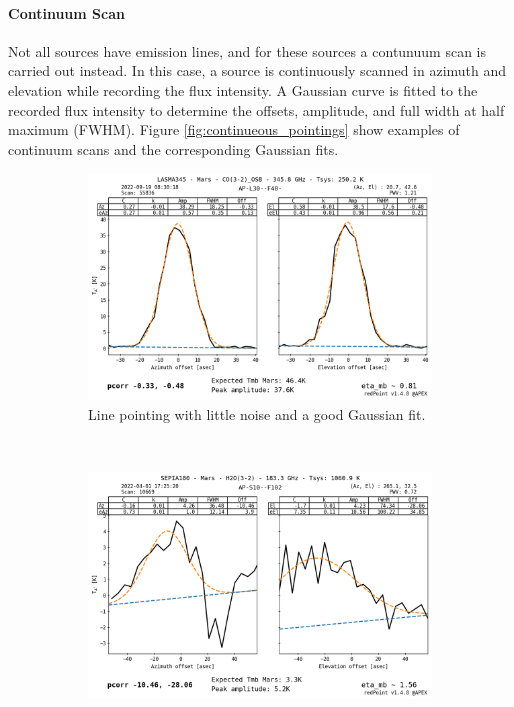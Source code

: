\paragraph{Continuum Scan}
Not all sources have emission lines, and for these sources a contunuum scan is carried out instead. In this case, a source is continuously scanned in azimuth and elevation while recording the flux intensity.
A Gaussian curve is fitted to the recorded flux intensity to determine the offsets, amplitude, and full width at half maximum (FWHM).
Figure \ref{fig:continueous_pointings} show examples of continuum scans and the corresponding Gaussian fits.

\begin{figure}[H]
    \centering
     \begin{subfigure}[b]{0.75\textwidth}
         \centering
         \includegraphics[width=\textwidth]{Pointing Scans/good_continuous.png}
         \caption{Line pointing with little noise and a good Gaussian fit.}
         \label{subfig:good_continuous}
     \end{subfigure}
    \\
     \begin{subfigure}[b]{0.75\textwidth}
         \centering
         \includegraphics[width=\textwidth]{Pointing Scans/bad_continuous.png}

\end{subfigure}
\end{figure}
